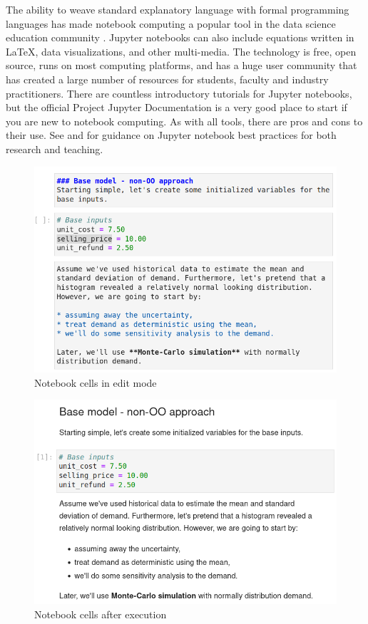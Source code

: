 \documentclass[ited]{informs3}                      %
\begin{document}
The ability to weave standard explanatory language with formal programming languages has made notebook computing a popular tool in the data science education community \citep{perkel2018jupyter}. Jupyter notebooks can also include equations written in \LaTeX, data visualizations, and other multi-media. The technology is free, open source, runs on most computing platforms, and has a huge user community that has created a large number of resources for students, faculty and industry practitioners. There are countless introductory tutorials for Jupyter notebooks, but the official Project Jupyter Documentation \citep{jupyterteamProjectJupyterDocumentation2015} is a very good place to start if you are new to notebook computing. As with all tools, there are pros and cons to their use. See \citet{rule2018ten, barba2019teaching} and \citet{johnson2020benefits} for guidance on Jupyter notebook best practices for both research and teaching.



\begin{figure}[!htbp]
\centering
\includegraphics[scale=0.5]{images/cells_edit_mode}
\caption{Notebook cells in edit mode}
\label{fig:cells_edit_mode}
\end{figure}

\begin{figure}[!htbp]
\centering
\includegraphics[scale=0.5]{images/cells_after_running}
\caption{Notebook cells after execution}
\label{fig:cells_after_running}
\end{figure}
\end{document}
